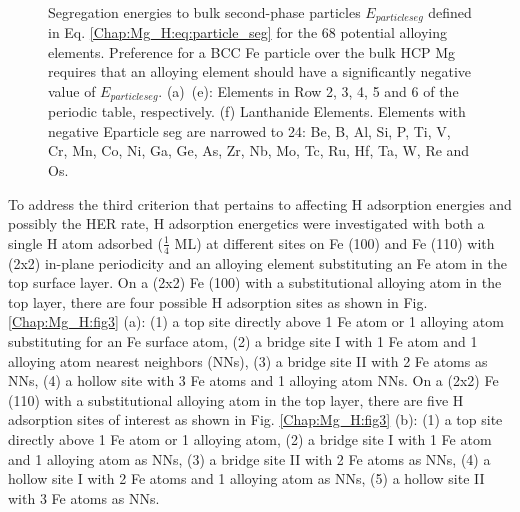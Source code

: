 \begin{figure}[!ht]
  \\
  \label{Chap:Mg_H:fig:5e}
  \label{Chap:Mg_H:fig:5f}
\caption[Segregation energies to bulk second-phase particles]{Segregation energies to bulk second-phase particles $E_{particle seg}$ defined in Eq. \ref{Chap:Mg_H:eq:particle_seg} for the 68 potential alloying elements. Preference for a \ac{BCC} Fe particle over the bulk \ac{HCP} Mg requires that an alloying element should have a significantly negative value of $E_{particle seg}$. (a)~(e): Elements in Row 2, 3, 4, 5 and 6 of the periodic table, respectively. (f) Lanthanide Elements. Elements with negative Eparticle seg are narrowed to 24: Be, B, Al, Si, P, Ti, V, Cr, Mn, Co, Ni, Ga, Ge, As, Zr, Nb, Mo, Tc, Ru, Hf, Ta, W, Re and Os.}
  \label{Chap:Mg_H:fig5}
\end{figure}
\endgroup

To address the third criterion that pertains to affecting H adsorption energies and possibly the HER rate, H adsorption energetics were investigated with both a single H atom adsorbed ($\frac{1}{4}$ \ac{ML}) at different sites on Fe (100) and Fe (110) with (2x2) in-plane periodicity and an alloying element substituting an Fe atom in the top surface layer. On a (2x2) Fe (100) with a substitutional alloying atom in the top layer, there are four possible H adsorption sites as shown in Fig. \ref{Chap:Mg_H:fig3} (a): (1) a top site directly above 1 Fe atom or 1 alloying atom substituting for an Fe surface atom, (2) a bridge site I with 1 Fe atom and 1 alloying atom nearest neighbors (NNs), (3) a bridge site II with 2 Fe atoms as NNs, (4) a hollow site with 3 Fe atoms and 1 alloying atom NNs. On a (2x2) Fe (110) with a substitutional alloying atom in the top layer, there are five H adsorption sites of interest as shown in Fig. \ref{Chap:Mg_H:fig3} (b): (1) a top site directly above 1 Fe atom or 1 alloying atom, (2) a bridge site I with 1 Fe atom and 1 alloying atom as NNs, (3) a bridge site II with 2 Fe atoms as NNs, (4) a hollow site I with 2 Fe atoms and 1 alloying atom as NNs, (5) a hollow site II with 3 Fe atoms as NNs.


